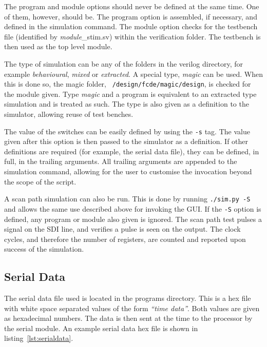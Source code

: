 The program and module options should never be defined at the same time. 
One of them, however, should be. 
The program option is assembled, if necessary, and defined in the simulation command. 
The module option checks for the testbench file (identified by \textit{module}\_stim.sv) within the verification folder. 
The testbench is then used as the top level module. 

The type of simulation can be any of the folders in the verilog directory, for example \textit{behavioural}, \textit{mixed} or \textit{extracted}. 
A special type, \textit{magic} can be used.
When this is done so, the magic folder, \texttt{~/design/fcde/magic/design}, is checked for the module given. 
Type \textit{magic} and a program is equivalent to an extracted type simulation and is treated as such. 
The type is also given as a definition to the simulator, allowing reuse of test benches. 

The value of the switches can be easily defined by using the \texttt{-s} tag. 
The value given after this option is then passed to the simulator as a definition. 
If other definitions are required (for example, the serial data file), they can be defined, in full, in the trailing arguments. 
All trailing arguments are appended to the simulation command, allowing for the user to customise the invocation beyond the scope of the script. 

A scan path simulation can also be run.
This is done by running \texttt{./sim.py -S} and allows the same use described above for invoking the GUI.
If the \texttt{-S} option is defined, any program or module also given is ignored.
The scan path test pulses a signal on the SDI line, and verifies a pulse is seen on the output. 
The clock cycles, and therefore the number of registers, are counted and reported upon success of the simulation.






\subsection{Serial Data}

The serial data file used is located in the programs directory. 
This is a hex file with white space separated values of the form \textit{``time data''}.
Both values are given as hexadecimal numbers. 
The data is then sent at the time to the processor by the serial module. 
An example serial data hex file is shown in listing~\ref{lst:serialdata}.


